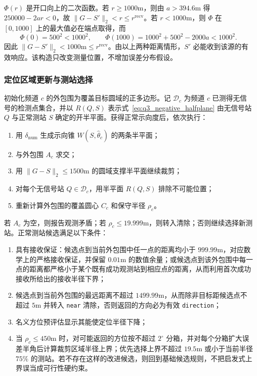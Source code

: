 $\Phi(r)$ 是开口向上的二次函数。若 $r\ge1000\mathrm{m}$，则由 $a>394.6\mathrm{m}$ 得 $250000-2ar<0$，故 $\lVert G-S'\rVert_2<r\le r^{\mathrm{recv}}$。若 $r<1000\mathrm{m}$，则 $\Phi$ 在 $[0,1000]$ 上的最大值必在端点取得，而
\[
\Phi(0)=500^2<1000^2,
\qquad
\Phi(1000)=1000^2+500^2-2000a<1000^2.
\]
因此 $\lVert G-S'\rVert_2<1000\mathrm{m}\le r^{\mathrm{recv}}$。由以上两种距离情形，$S'$ 必能收到该源的有效响应。该构造只改变测量位置，不增加误差分布假设。

\subsubsection{定位区域更新与测站选择}

初始化频道 $c$ 的外包围为覆盖目标圆域的正多边形。记 $\mathcal D_c$ 为频道 $c$ 已测得无信号的检测点集合，并以 $R(Q,S)$ 表示式~\eqref{eq:q3_negative_halfplane} 由无信号站 $Q$ 与正常测站 $S$ 确定的开半平面。获得正常示向度后，依次执行：

\begin{enumerate}
\item 用 $\delta_{\mathrm{num}}$ 生成示向锥 $W(S,\hat\theta_c)$ 的两条半平面；
\item 与外包围 $A_c$ 求交；
\item 用 $\lVert G-S\rVert_2\le1500\mathrm{m}$ 的圆域支撑半平面继续裁剪；
\item 对每个无信号站 $Q\in\mathcal D_c$，用半平面 $R(Q,S)$ 排除不可能位置；
\item 重新计算外包围的覆盖圆心 $C_c$ 和保守半径 $\rho_c$。
\end{enumerate}

若 $A_c$ 为空，则报告观测矛盾；若 $\rho_c\le19.999\mathrm{m}$，则转入清除；否则继续选择新测站。正常测站候选满足以下条件：

\begin{enumerate}
\item 具有接收保证：候选点到当前外包围中任一点的距离均小于 $999.99\mathrm{m}$，对应数学上的严格接收保证，并保留 $0.01\mathrm{m}$ 的数值余量；或候选点到该外包围中每一点的距离都严格小于某个既有成功观测站到相应点的距离，从而利用首次成功接收所给出的接收半径下界；
\item 候选点到当前外包围的最远距离不超过 $1499.99\mathrm{m}$，从而除非目标距候选点不超过 $5\mathrm{m}$ 并转入 \texttt{near} 清除，否则返回的方向必为有效 \texttt{direction}；
\item 名义方位预评估显示其能使定位半径下降；
\item 当 $\rho_c\le450\mathrm{m}$ 时，对可能返回的方位按不超过 $2^\circ$ 分箱，并对每个分箱扩大误差半角后计算裁剪区域半径上界；优先选择上界不超过 $19.5\mathrm{m}$ 或小于当前半径 $75\%$ 的测站。若不存在这样的改进候选，则回到基础候选规则，不把启发式上界误当成可行性硬约束。
\end{enumerate}

